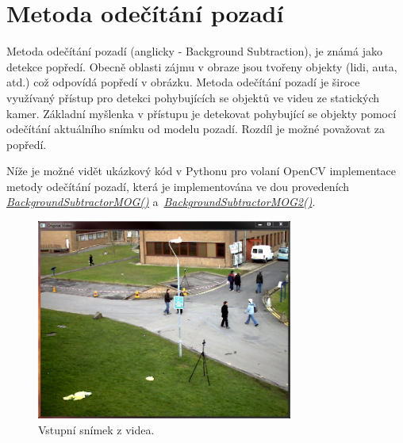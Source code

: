\documentclass[12pt, a4paper]{article}
\begin{document}
\section{Metoda odečítání pozadí}
\par{Metoda odečítání pozadí (anglicky - Background Subtraction), je známá jako detekce popředí. Obecně oblasti zájmu v obraze jsou tvořeny objekty (lidi, auta, atd.) což odpovídá popředí v obrázku. Metoda odečítání pozadí je široce využívaný přístup pro detekci pohybujících se objektů ve videu ze statických kamer. Základní myšlenka v přístupu je detekovat pohybující se objekty pomocí odečítání aktuálního snímku od modelu pozadí. Rozdíl je možné považovat za popředí.}

\par{Níže je možné vidět ukázkový kód v Pythonu pro volaní OpenCV implementace metody odečítání pozadí, která je implementována ve dou provedeních \href{http://docs.opencv.org/modules/video/doc/motion_analysis_and_object_tracking.html?highlight=backgroundsubtractormog#BackgroundSubtractorMOG : public BackgroundSubtractor}{\textit{BackgroundSubtractorMOG()}} a~\href{http://docs.opencv.org/modules/video/doc/motion_analysis_and_object_tracking.html?highlight=backgroundsubtractormog2#BackgroundSubtractorMOG2 : public BackgroundSubtractor}{\textit{BackgroundSubtractorMOG2()}}.}



\newpage

\begin{figure}[!ht]
	\centering
	\includegraphics[width = 0.75\textwidth]{./original.png}
	\caption{Vstupní snímek z videa.}
	\label{fig:original}
\end{figure}
\end{document}
